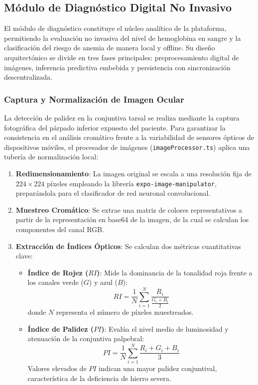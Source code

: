 \subsection{Módulo de Diagnóstico Digital No Invasivo}
\label{sec:modulo_diagnostico}

El módulo de diagnóstico constituye el núcleo analítico de la plataforma, permitiendo la evaluación no invasiva del nivel de hemoglobina en sangre y la clasificación del riesgo de anemia de manera local y offline. Su diseño arquitectónico se divide en tres fases principales: preprocesamiento digital de imágenes, inferencia predictiva embebida y persistencia con sincronización descentralizada.

\subsubsection{Captura y Normalización de Imagen Ocular}
La detección de palidez en la conjuntiva tarsal se realiza mediante la captura fotográfica del párpado inferior expuesto del paciente. Para garantizar la consistencia en el análisis cromático frente a la variabilidad de sensores ópticos de dispositivos móviles, el procesador de imágenes (\texttt{imageProcessor.ts}) aplica una tubería de normalización local:
\begin{enumerate}
    \item \textbf{Redimensionamiento}: La imagen original se escala a una resolución fija de $224 \times 224$ píxeles empleando la librería \texttt{expo-image-manipulator}, preparándola para el clasificador de red neuronal convolucional.
    \item \textbf{Muestreo Cromático}: Se extrae una matriz de colores representativos a partir de la representación en base64 de la imagen, de la cual se calculan los componentes del canal RGB.
    \item \textbf{Extracción de Índices Ópticos}: Se calculan dos métricas cuantitativas clave:
    \begin{itemize}
        \item \textbf{Índice de Rojez ($RI$)}: Mide la dominancia de la tonalidad roja frente a los canales verde ($G$) y azul ($B$):
        \begin{equation}
            RI = \frac{1}{N} \sum_{i=1}^{N} \frac{R_i}{\frac{G_i + B_i}{2}}
        \end{equation}
        donde $N$ representa el número de píxeles muestreados.
        \item \textbf{Índice de Palidez ($PI$)}: Evalúa el nivel medio de luminosidad y atenuación de la conjuntiva palpebral:
        \begin{equation}
            PI = \frac{1}{N} \sum_{i=1}^{N} \frac{R_i + G_i + B_i}{3}
        \end{equation}
        Valores elevados de $PI$ indican una mayor palidez conjuntival, característica de la deficiencia de hierro severa.
    \end{itemize}
\end{enumerate}

